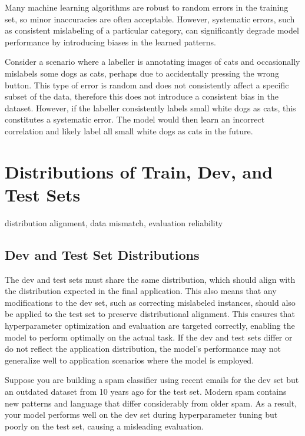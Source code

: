 \documentclass[12pt,openany]{book}
\begin{document}
Many machine learning algorithms are robust to random errors in the training set, so minor inaccuracies are often acceptable. However, systematic errors, such as consistent mislabeling of a particular category, can significantly degrade model performance by introducing biases in the learned patterns. \newline

\begin{examplebox}
Consider a scenario where a labeller is annotating images of cats and occasionally mislabels some dogs as cats, perhaps due to accidentally pressing the wrong button. This type of error is random and does not consistently affect a specific subset of the data, therefore this does not introduce a consistent bias in the dataset. However, if the labeller consistently labels small white dogs as cats, this constitutes a systematic error. The model would then learn an incorrect correlation and likely label all small white dogs as cats in the future. 
\end{examplebox}



\section{Distributions of Train, Dev, and Test Sets}

\begin{keywordsbox}
distribution alignment, data mismatch, evaluation reliability
\end{keywordsbox}

\subsection{Dev and Test Set Distributions}
The dev and test sets must share the same distribution, which should align with the distribution expected in the final application. This also means that any modifications to the dev set, such as correcting mislabeled instances, should also be applied to the test set to preserve distributional alignment. This ensures that hyperparameter optimization and evaluation are targeted correctly, enabling the model to perform optimally on the actual task. If the dev and test sets differ or do not reflect the application distribution, the model's performance may not generalize well to application scenarios where the model is employed. \newline

\begin{examplebox}
Suppose you are building a spam classifier using recent emails for the dev set but an outdated dataset from 10 years ago for the test set. Modern spam contains new patterns and language that differ considerably from older spam. As a result, your model performs well on the dev set during hyperparameter tuning but poorly on the test set, causing a misleading evaluation.
\end{examplebox}
\end{document}
